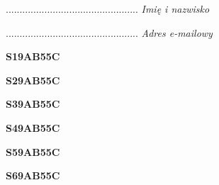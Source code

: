 \begin{turn}{90}\begin{minipage}{\linewidth} \vspace{20mm} ................................................  \textit{Imię i nazwisko}\end{minipage}\end{turn}

\begin{turn}{90}\begin{minipage}{\linewidth} \vspace{20mm} ................................................  \textit{Adres e-mailowy}\end{minipage}\end{turn}

\begin{turn}{90}\huge \begin{minipage}{\linewidth} \vspace{10mm}\textbf{S19AB55C}\end{minipage}\end{turn}

\begin{turn}{90}\huge \begin{minipage}{\linewidth} \vspace{10mm}\textbf{S29AB55C}\end{minipage}\end{turn}

\begin{turn}{90}\huge \begin{minipage}{\linewidth} \vspace{10mm}\textbf{S39AB55C}\end{minipage}\end{turn}

\begin{turn}{90}\huge \begin{minipage}{\linewidth} \vspace{10mm}\textbf{S49AB55C}\end{minipage}\end{turn}

\begin{turn}{90}\huge \begin{minipage}{\linewidth} \vspace{10mm}\textbf{S59AB55C}\end{minipage}\end{turn}

\begin{turn}{90}\huge \begin{minipage}{\linewidth} \vspace{10mm}\textbf{S69AB55C}\end{minipage}\end{turn}

